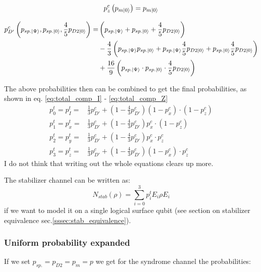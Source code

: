 \begin{align*}
    p^c_z \left(p_{m\ket{0}} \right) =  p_{m\ket{0}}\\
\end{align*}

\begin{align*}
    p^c_{D'} \left(p_{sp.\ket{\Psi}},p_{sp.\ket{0}}, \frac{4}{5}p_{D2\ket{0}} \right) = 
    &   \left(p_{sp.\ket{\Psi}} + p_{sp.\ket{0}} + \frac{4}{5}p_{D2\ket{0}} \right) \\
    & -\frac{4}{3} \left(
        p_{sp.\ket{\Psi}}p_{sp.\ket{0}} 
        + p_{sp.\ket{\Psi}}\frac{4}{5}p_{D2\ket{0}} 
        + p_{sp.\ket{0}} \frac{4}{5}p_{D2\ket{0}} 
        \right) \\
    & +\frac{16}{9} \left(p_{sp.\ket{\Psi}}\cdot p_{sp.\ket{0}} \cdot \frac{4}{5}p_{D2\ket{0}} \right) \\
\end{align*}

The above probabilities then can be combined to get the final probabilities, as shown in eq. \ref{eq:total_comp_I} - \ref{eq:total_comp_Z} 
\begin{align}
    p_0^t = p_I^t =& \frac{1}{3} p_{D'}^c + \left( 1-\frac{4}{3}p_{D'}^c\right) (1-p_x^c)\cdot(1-p_z^c) \\
    p_1^t = p_x^t =& \frac{1}{3} p_{D'}^c + \left( 1-\frac{4}{3}p_{D'}^c\right) p_x^c \cdot(1-p_z^c) \\
    p_2^t = p_y^t =& \frac{1}{3} p_{D'}^c + \left( 1-\frac{4}{3}p_{D'}^c\right) p_x^c\cdot p_z^c\\
    p_3^t = p_z^t =& \frac{1}{3} p_{D'}^c + \left( 1-\frac{4}{3}p_{D'}^c\right) (1-p_x^c)\cdot p_z^c
\end{align}
I do not think that writing out the whole equations clears up more.

The stabilizer channel can be written as:
\begin{equation}
    N_{stab} (\rho) = \sum_{i=0}^{3} p_i^t E_i \rho E_i
\end{equation}
if we want to model it on a single logical surface qubit (see section on stabilizer equivalence sec.\ref{sssec:stab_equivalence}).

\subsubsection{Uniform probability expanded}
If we set $p_{sp.}=p_{D2}=p_{m}=p$ we get for the syndrome channel the probabilities: 

